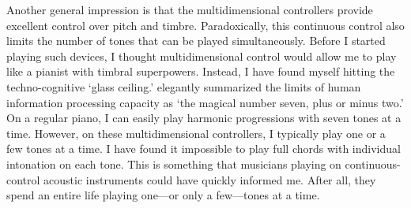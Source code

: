 Another general impression is that the multidimensional controllers provide excellent control over pitch and timbre. Paradoxically, this continuous control also limits the number of tones that can be played simultaneously. Before I started playing such devices, I thought multidimensional control would allow me to play like a pianist with timbral superpowers. Instead, I have found myself hitting the techno-cognitive `glass ceiling.' \citet{miller_magical_1956} elegantly summarized the limits of human information processing capacity as `the magical number seven, plus or minus two.' On a regular piano, I can easily play harmonic progressions with seven tones at a time. However, on these multidimensional controllers, I typically play one or a few tones at a time. I have found it impossible to play full chords with individual intonation on each tone. This is something that musicians playing on continuous-control acoustic instruments could have quickly informed me. After all, they spend an entire life playing one---or only a few---tones at a time.
